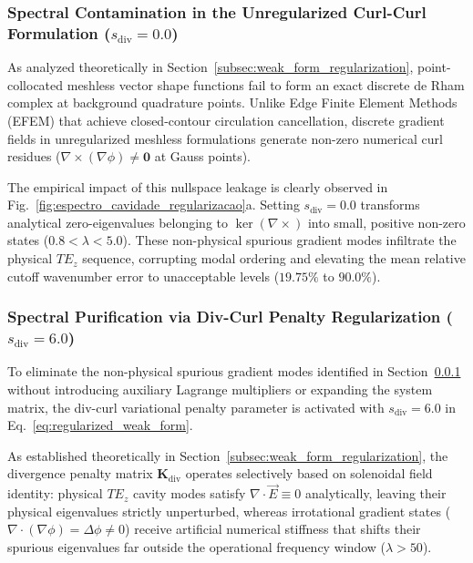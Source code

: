\documentclass[preprint,12pt]{elsarticle}
\begin{document}
\subsubsection{Spectral Contamination in the Unregularized Curl-Curl Formulation ($s_{\mathrm{div}} = 0.0$)}
\label{subsubsec:unregularized_formulation}

As analyzed theoretically in Section~\ref{subsec:weak_form_regularization}, point-collocated meshless vector shape functions fail to form an exact discrete de Rham complex at background quadrature points. Unlike Edge Finite Element Methods (EFEM) that achieve closed-contour circulation cancellation, discrete gradient fields in unregularized meshless formulations generate non-zero numerical curl residues ($\nabla \times (\nabla \phi) \neq \mathbf{0}$ at Gauss points).

The empirical impact of this nullspace leakage is clearly observed in Fig.~\ref{fig:espectro_cavidade_regularizacao}a. Setting $s_{\mathrm{div}} = 0.0$ transforms analytical zero-eigenvalues belonging to $\ker(\nabla \times)$ into small, positive non-zero states ($0.8 < \lambda < 5.0$). These non-physical spurious gradient modes infiltrate the physical $TE_z$ sequence, corrupting modal ordering and elevating the mean relative cutoff wavenumber error to unacceptable levels ($19.75\%$ to $90.0\%$).

\subsubsection{Spectral Purification via Div-Curl Penalty Regularization ($s_{\mathrm{div}} = 6.0$)}
\label{subsubsec:regularized_formulation}

To eliminate the non-physical spurious gradient modes identified in Section~\ref{subsubsec:unregularized_formulation} without introducing auxiliary Lagrange multipliers or expanding the system matrix, the div-curl variational penalty parameter is activated with $s_{\mathrm{div}} = 6.0$ in Eq.~\eqref{eq:regularized_weak_form}.

As established theoretically in Section~\ref{subsec:weak_form_regularization}, the divergence penalty matrix $\mathbf{K}_{\mathrm{div}}$ operates selectively based on solenoidal field identity: physical $TE_z$ cavity modes satisfy $\nabla \cdot \vec{E} \equiv 0$ analytically, leaving their physical eigenvalues strictly unperturbed, whereas irrotational gradient states ($\nabla \cdot (\nabla \phi) = \Delta \phi \neq 0$) receive artificial numerical stiffness that shifts their spurious eigenvalues far outside the operational frequency window ($\lambda > 50$).
\end{document}
